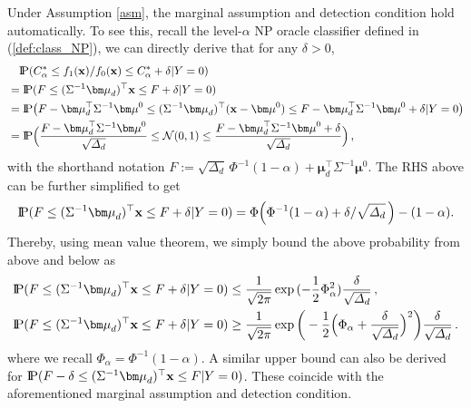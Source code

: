 \documentclass[12pt]{article}
\numberwithin{equation}{section}
\theoremstyle{remark}
\newcommand{\p}{{\rm I}\kern-0.18em{\rm P}}
\newcommand{\1}{{\rm 1}\kern-0.24em{\rm I}}
\begin{document}
\begin{appendices}
Under Assumption \ref{asm}, the marginal assumption and detection condition hold automatically. To see this, recall the level-$\alpha$ NP oracle classifier defined in  (\ref{def:class_NP}), we can directly derive that for any $\delta>0$,
\begin{align*}
&\quad \p (C^*_{\alpha}\leq f_1({\bf x})/f_0({\bf x}) \leq C^*_{\alpha} + \delta| Y=0) \notag\\
    &= \p (F\leq (\Sigma^{-1} {\bm \mu}_d)^\top {\bf x} \leq F + \delta| Y=0) \notag\\
    &= \p \big(F - {\bm \mu}_d^\top \Sigma^{-1} {\bm \mu}^0 \leq (\Sigma^{-1} {\bm \mu}_d)^\top ({\bf x}-{\bm \mu}^0) \leq F - {\bm \mu}_d^\top \Sigma^{-1} {\bm \mu}^0+ \delta |Y=0\big)\notag\\
    &= \p\Big(\frac{F - {\bm \mu}_d^\top \Sigma^{-1} {\bm \mu}^0}{\sqrt{\varDelta_d}}\leq \mathcal{N}(0,1) \leq \frac{F - {\bm \mu}_d^\top \Sigma^{-1} {\bm \mu}^0 + \delta}{\sqrt{\varDelta_d}}\Big)\,,
\end{align*}
with the shorthand notation $F:=\sqrt{\varDelta_d} \, \Phi^{-1}(1-\alpha) + {\bm{\mu}}_d^{\top} \Sigma^{-1} {\bm{\mu}}^0$. The RHS above can be further simplified to get
\begin{align*}
    \p (F\leq (\Sigma^{-1} {\bm \mu}_d)^\top {\bf x} \leq F + \delta| Y=0)=\Phi\Big(\Phi^{-1}(1-\alpha) + {\delta}/{\sqrt{\varDelta_d} }\, \Big) - (1-\alpha). 
\end{align*}
Thereby, using mean value theorem, we simply bound the above probability from above and below as
\begin{align*}
    \p (F\leq (\Sigma^{-1} {\bm \mu}_d)^\top {\bf x} \leq F + \delta| Y=0)&\leq \frac{1}{\sqrt{2\pi}} \exp{(-\frac 12 \Phi_\alpha^2)} \frac{\delta}{\sqrt{\varDelta_d} }\,, \notag\\
    \p (F\leq (\Sigma^{-1} {\bm \mu}_d)^\top {\bf x} \leq F + \delta| Y=0)&\geq\frac{1}{\sqrt{2\pi}} \exp{\bigg(-\frac 12 \Big(\Phi_\alpha + \frac{\delta}{\sqrt{\varDelta_d} } \Big)^2 \bigg)} \frac{\delta}{\sqrt{\varDelta_d} }\,.
\end{align*}
where we recall $\Phi_\alpha= \Phi^{-1} (1-\alpha)$.
A similar upper bound can also be derived for $\p (F-\delta\leq (\Sigma^{-1} {\bm \mu}_d)^\top {\bf x} \leq F | Y=0)$. These coincide with the aforementioned marginal assumption and detection condition. %



\end{appendices}
\end{document}
